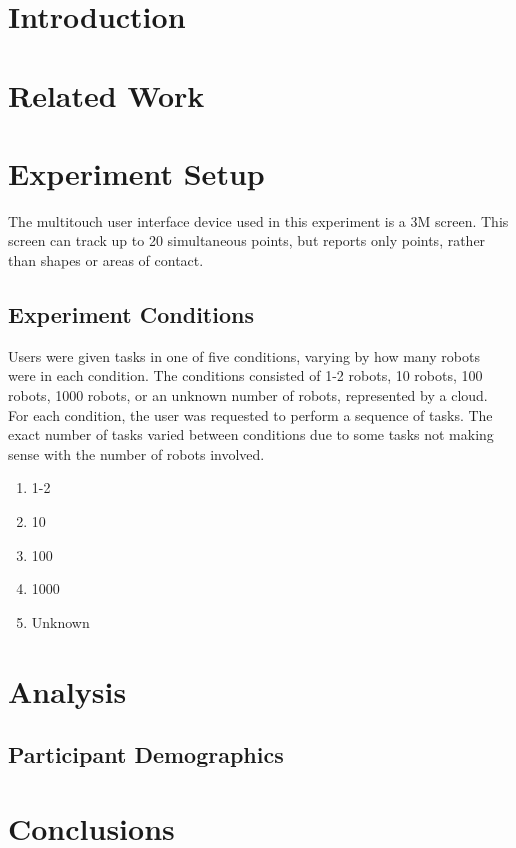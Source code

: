 \documentclass[]{article}
\title{}
\author{}
\begin{document}
\maketitle

\begin{abstract}

\end{abstract}

\section{Introduction}

\section{Related Work}

\section{Experiment Setup}


The multitouch user interface device used in this experiment is a 3M  screen. 
This screen can track up to 20 simultaneous points, but reports only points, rather than shapes or areas of contact. 


\subsection{Experiment Conditions}

Users were given tasks in one of five conditions, varying by how many robots were in each condition. 
The conditions consisted of 1-2 robots, 10 robots, 100 robots, 1000 robots, or an unknown number of robots, represented by a cloud. 
For each condition, the user was requested to perform a sequence of tasks. 
The exact number of tasks varied between conditions due to some tasks not making sense with the number of robots involved. 

\begin{multicols}{2}
	\begin{enumerate}[noitemsep]
	\item 1-2
	\item 10
	\item 100
	\item 1000
	\item Unknown
	\end{enumerate}
\end{multicols} 	

\section{Analysis}

\subsection{Participant Demographics}

\section{Conclusions}



\end{document}
